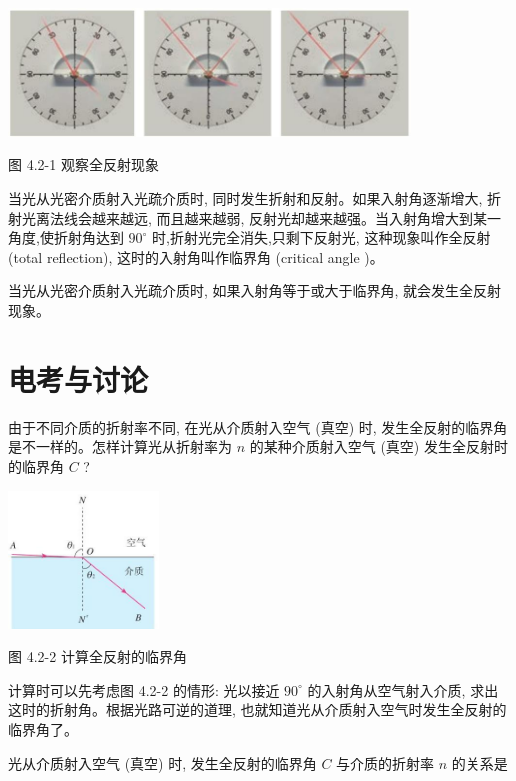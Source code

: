\documentclass[10pt]{article}
\begin{document}
\begin{center}
\includegraphics[max width=0.8\textwidth]{images/01910e4c-ebb8-7d2c-8f2f-2375bc1d2d12_95_577406.jpg}
\end{center}

图 4.2-1 观察全反射现象

当光从光密介质射入光疏介质时, 同时发生折射和反射。如果入射角逐渐增大, 折射光离法线会越来越远, 而且越来越弱, 反射光却越来越强。当入射角增大到某一角度,使折射角达到 \({90}^{ \circ }\) 时,折射光完全消失,只剩下反射光, 这种现象叫作全反射 (total reflection), 这时的入射角叫作临界角 (critical angle )。

当光从光密介质射入光疏介质时, 如果入射角等于或大于临界角, 就会发生全反射现象。

\section*{电考与讨论}

由于不同介质的折射率不同, 在光从介质射入空气 (真空) 时, 发生全反射的临界角是不一样的。怎样计算光从折射率为 \(n\) 的某种介质射入空气 (真空) 发生全反射时的临界角 \(C\) ?

\begin{center}
\includegraphics[max width=0.3\textwidth]{images/01910e4c-ebb8-7d2c-8f2f-2375bc1d2d12_96_489653.jpg}
\end{center}

图 4.2-2 计算全反射的临界角

计算时可以先考虑图 4.2-2 的情形: 光以接近 \({90}^{ \circ }\) 的入射角从空气射入介质, 求出这时的折射角。根据光路可逆的道理, 也就知道光从介质射入空气时发生全反射的临界角了。

光从介质射入空气 (真空) 时, 发生全反射的临界角 \(C\) 与介质的折射率 \(n\) 的关系是
\end{document}
